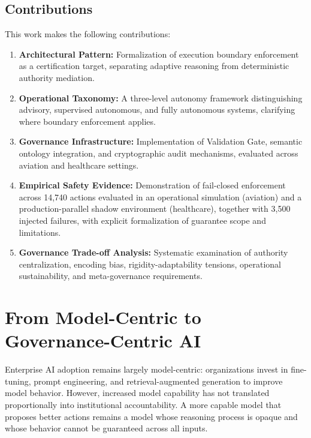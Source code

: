 \documentclass[sigconf,nonacm]{acmart}
\begin{document}
\subsection{Contributions}

This work makes the following contributions:

\begin{enumerate}
    \item \textbf{Architectural Pattern:} Formalization of execution boundary enforcement as a certification target, separating adaptive reasoning from deterministic authority mediation.

    \item \textbf{Operational Taxonomy:} A three-level autonomy framework distinguishing advisory, supervised autonomous, and fully autonomous systems, clarifying where boundary enforcement applies.

    \item \textbf{Governance Infrastructure:} Implementation of Validation Gate, semantic ontology integration, and cryptographic audit mechanisms, evaluated across aviation and healthcare settings.

    \item \textbf{Empirical Safety Evidence:} Demonstration of fail-closed enforcement across 14{,}740 actions evaluated in an operational simulation (aviation) and a production-parallel shadow environment (healthcare), together with 3{,}500 injected failures, with explicit formalization of guarantee scope and limitations.

    \item \textbf{Governance Trade-off Analysis:} Systematic examination of authority centralization, encoding bias, rigidity-adaptability tensions, operational sustainability, and meta-governance requirements.
\end{enumerate}

\section{From Model-Centric to Governance-Centric AI}

Enterprise AI adoption remains largely model-centric: organizations invest in fine-tuning, prompt engineering, and retrieval-augmented generation to improve model behavior. However, increased model capability has not translated proportionally into institutional accountability. A more capable model that proposes better actions remains a model whose reasoning process is opaque and whose behavior cannot be guaranteed across all inputs.
\end{document}
